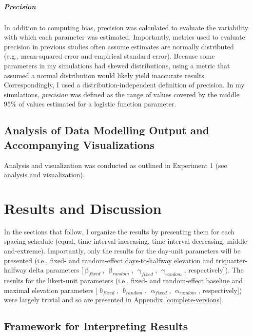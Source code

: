 \documentclass[
12pt, %
twoside,
english]{guelphthesis}
\begin{document}
\hypertarget{precision}{%
\subparagraph{Precision}\label{precision}}

In addition to computing bias, precision was calculated to evaluate the variability with which each parameter was estimated. Importantly, metrics used to evaluate precision in previous studies often assume estimates are normally distributed (e.g., mean-squared error and empirical standard error). Because some parameters in my simulations had skewed distributions, using a metric that assumed a normal distribution would likely yield inaccurate results. Correspondingly, I used a distribution-independent definition of precision. In my simulations, \emph{precision} was defined as the range of values covered by the middle 95\% of values estimated for a logistic function parameter.

\hypertarget{analysis-of-data-modelling-output-and-accompanying-visualizations}{%
\subsection{Analysis of Data Modelling Output and Accompanying Visualizations}\label{analysis-of-data-modelling-output-and-accompanying-visualizations}}

Analysis and visualization was conducted as outlined in Experiment 1 (see \protect\hyperlink{analysis-visualizationux5cux257D}{analysis and visualization}).

\hypertarget{results-and-discussion-1}{%
\section{Results and Discussion}\label{results-and-discussion-1}}

In the sections that follow, I organize the results by presenting them for each spacing schedule (equal, time-interval increasing, time-interval decreasing, middle-and-extreme). Importantly, only the results for the day-unit parameters will be presented (i.e., fixed- and random-effect days-to-halfway elevation and triquarter-halfway delta parameters {[}\(\upbeta_{fixed}\), \(\upbeta_{random}\), \(\upgamma_{fixed}\), \(\upgamma_{random}\), respectively{]}). The results for the likert-unit parameters (i.e., fixed- and random-effect baseline and maximal elevation parameters {[}\(\uptheta_{fixed}\), \(\uptheta_{random}\), \(\upalpha_{fixed}\), \(\upalpha_{random}\), respectively{]}) were largely trivial and so are presented in Appendix \ref{complete-versions}.

\hypertarget{framework-for-interpreting-results-1}{%
\subsection{Framework for Interpreting Results}\label{framework-for-interpreting-results-1}}
\end{document}
